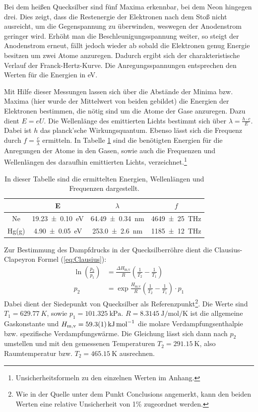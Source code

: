 	Bei dem heißen Quecksilber sind fünf Maxima erkennbar, bei dem Neon hingegen drei.
	Dies zeigt, dass die Restenergie der Elektronen nach dem Stoß nicht ausreicht, um die Gegenspannung zu überwinden, weswegen der Anodenstrom geringer wird.
	Erhöht man die Beschleunigungsspannung weiter, so steigt der Anodenstrom erneut, fällt jedoch wieder ab sobald die Elektronen genug Energie besitzen um zwei Atome anzuregen.
	Dadurch ergibt sich der charakteristische Verlauf der Franck-Hertz-Kurve.
	Die Anregungsspannungen entsprechen den Werten für die Energien in \si{\electronvolt}.
	 
	Mit Hilfe dieser Messungen lassen sich über die Abstände der Minima bzw. Maxima (hier wurde der Mittelwert von beiden gebildet) die Energien der Elektronen bestimmen, die nötig sind um die Atome der Gase anzuregen.
	Dazu dient $E=eU$. 
	Die Wellenlänge des emittierten Lichts bestimmt sich über $\lambda = \frac{h \cdot c}{E}$.
	Dabei ist $h$ das planck'sche Wirkungsquantum.
	Ebenso lässt sich die Frequenz durch $f = \frac{c}{\lambda}$ ermitteln. 
	In Tabelle \ref{tab:Werte} sind die benötigten Energien für die Anregungen der Atome in den Gasen, sowie auch die Frequenzen und Wellenlängen des daraufhin emittierten Lichts, verzeichnet.\footnote{Unsicherheitsformeln zu den einzelnen Werten im Anhang.}
	\begin{table}
		\caption{In dieser Tabelle sind die ermittelten Energien, Wellenlängen und Frequenzen dargestellt.}
		\label{tab:Werte}
		\centering
		\begin{tabular}{c|c|c|c}
			& E & $\lambda$ & $f$ \\			
			\hline		
			Ne & \SI{19.23+-0.10}{\electronvolt} & \SI{64.49+-0.34}{\nano\meter} & \SI{4649+-25}{\tera\hertz} \\
			Hg(g) & \SI{4.90+-0.05}{\electronvolt} & \SI{253.0+-2.6}{\nano\meter} & \SI{1185+-12}{\tera\hertz} \\				
		\end{tabular}
	\end{table}

	Zur Bestimmung des Dampfdrucks in der Quecksilberröhre dient die Clausius-Clapeyron Formel (\ref{eq:Clausius}):
	\begin{align} \label{eq:Clausius}
		\ln(\frac{p_2}{p_1}) &= \frac{\Delta H_\text{m,v}}{R}\left( \frac{1}{T_2} - \frac{1}{T_1} \right) \\
		p_2 &= \exp{\frac{H_\text{m,v}}{R} \left( \frac{1}{T_2} - \frac{1}{T_1} \right) } \cdot p_1
	\end{align}
	Dabei dient der Siedepunkt von Quecksilber als Referenzpunkt\cite{boilingPoint}\footnote{Wie in der Quelle unter dem Punkt Conclusions angemerkt, kann den beiden Werten eine relative Unsicherheit von 1\% zugeordnet werden.}.
	Die Werte sind $T_1 = \SI{629.77}{K}$, sowie $p_1 = \SI{101.325}{\kilo\pascal}$.
	$R = \SI{8.3145}{\joule\per\mol\per\kelvin}$ ist die allgemeine Gaskonstante\cite{Constants} und $H_\text{m,v} = \SI{59.3+-0.1}{\kilo\joule\per\mol}$ die molare Verdampfungsenthalpie bzw. spezifische Verdampfungswärme\cite{verdampfungswaerme}.
	Die Gleichung lässt sich dann nach $p_2$ umstellen und mit den gemessenen Temperaturen $T_2 = \SI{291.15}{\kelvin}$, also Raumtemperatur bzw. $T_2 = \SI{465.15}{\kelvin}$ ausrechnen.


